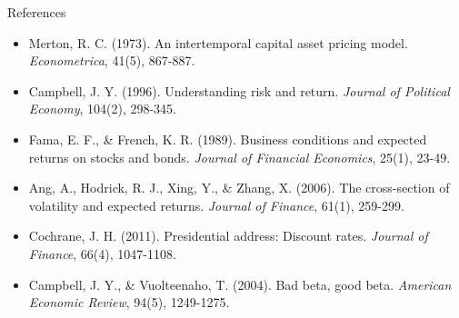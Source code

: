 \documentclass{beamer}
\begin{document}
\begin{frame}[allowframebreaks]{References}
\small
\begin{itemize}
\item Merton, R. C. (1973). An intertemporal capital asset pricing model. \textit{Econometrica}, 41(5), 867-887.
\vspace{0.2cm}

\item Campbell, J. Y. (1996). Understanding risk and return. \textit{Journal of Political Economy}, 104(2), 298-345.
\vspace{0.2cm}

\item Fama, E. F., \& French, K. R. (1989). Business conditions and expected returns on stocks and bonds. \textit{Journal of Financial Economics}, 25(1), 23-49.
\vspace{0.2cm}

\item Ang, A., Hodrick, R. J., Xing, Y., \& Zhang, X. (2006). The cross-section of volatility and expected returns. \textit{Journal of Finance}, 61(1), 259-299.
\vspace{0.2cm}

\item Cochrane, J. H. (2011). Presidential address: Discount rates. \textit{Journal of Finance}, 66(4), 1047-1108.
\vspace{0.2cm}

\item Campbell, J. Y., \& Vuolteenaho, T. (2004). Bad beta, good beta. \textit{American Economic Review}, 94(5), 1249-1275.
\end{itemize}
\end{frame}
\end{document}
